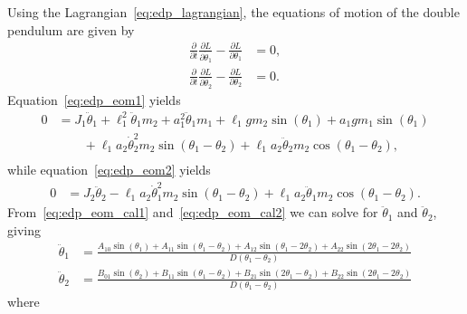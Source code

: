 \documentclass[11pt]{article}
\numberwithin{equation}{section}
\theoremstyle{plain}
\begin{document}
Using the Lagrangian~\eqref{eq:edp_lagrangian}, the equations of motion of the double pendulum are given by
\begin{subequations}
\label{eq:edp_eom}
\begin{align}
        \frac{\partial}{\partial t}\frac{\partial L}{\partial \dot{\theta}_1}-\frac{\partial L}{\partial \theta_1}&=0, \label{eq:edp_eom1}\\
        \frac{\partial}{\partial t}\frac{\partial L}{\partial \dot{\theta}_2}-\frac{\partial L}{\partial \theta_2}&=0. \label{eq:edp_eom2}
\end{align}
\end{subequations}
Equation~\eqref{eq:edp_eom1} yields
\begin{equation}\label{eq:edp_eom_cal1}
\begin{split}
0 &= J_1\ddot{\theta}_1 + \ell_1^2\ddot{\theta}_1m_2
        + a_1^2\ddot{\theta}_1m_1 +\ell_1gm_2\sin(\theta_1) + a_1gm_1\sin(\theta_1) \\ &\qquad + \ell_1a_2\dot{\theta}_2^2m_2\sin(\theta_1 - \theta_2)
        + \ell_1a_2\ddot{\theta}_2m_2\cos(\theta_1 - \theta_2),\\
\end{split}
\end{equation}
while equation~\eqref{eq:edp_eom2} yields
\begin{align}\label{eq:edp_eom_cal2}
        0 &= J_2\ddot{\theta}_2 - \ell_1a_2\dot{\theta}_1^2m_2\sin(\theta_1 - \theta_2) + \ell_1a_2\ddot{\theta}_1m_2\cos(\theta_1 - \theta_2).
\end{align}
From~\eqref{eq:edp_eom_cal1} and~\eqref{eq:edp_eom_cal2} we can solve for $\ddot\theta_1$ and $\ddot\theta_2$, giving
\begin{subequations}\label{eq:edp_ddtheta}
\begin{align}
        \ddot{\theta}_1&=\frac{A_{10}\sin(\theta_1)+A_{11}\sin(\theta_1-\theta_2)+A_{12}\sin(\theta_1-2\theta_2)+A_{22}\sin(2\theta_1-2\theta_2)}{D(\theta_1 - \theta_2)}\\
            \ddot{\theta}_2&=\frac{B_{01}\sin(\theta_2)+B_{11}\sin(\theta_1-\theta_2)+B_{21}\sin(2\theta_1-\theta_2)+B_{22}\sin(2\theta_1-2\theta_2)}{D(\theta_1 - \theta_2)}
\end{align}
\end{subequations}
where
\end{document}
